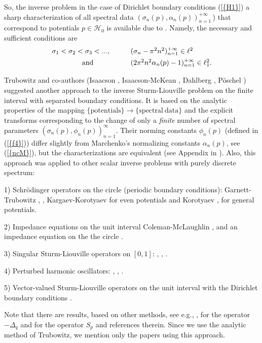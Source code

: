 \documentclass[10pt]{amsart}
\begin{document}
So, the inverse problem in the case of Dirichlet boundary conditions
{\textrm{(\ref{{H1}})}} a sharp characterization of  all spectral data
$({\sigma}_n(p),{\alpha}_n(p))_{n=1}^{+{\infty}}$\,) that correspond to potentials
$p\in{{\mathscr H}}_0$ is available due to \cite{MO75}. Namely, the necessary
and sufficient conditions are
\begin{equation}
\label{xMO75}
\begin{array}{cl}
{\sigma}_1<{\sigma}_2<{\sigma}_3<...,\qquad & ({\sigma}_n-\pi^2n^2)_{n=1}^{+{\infty}}\in\ell^2 \cr
\mathrm{and}\vphantom{|^\big|} &
(2\pi^2n^2{\alpha}_n(p)-1)_{n=1}^{+{\infty}}\in\ell_1^2.
\end{array}
\end{equation}

Trubowitz and co-authors (Isaacson \cite{IT83}, Isaacson-McKean
\cite{IMT84},  Dahlberg \cite{DT84}, P\"oschel \cite{PT87})
suggested another approach  to the inverse Sturm-Liouville problem
on the finite interval with separated boundary conditions. It is
based on the analytic properties of the mapping
$\mathrm{\{potentials\}\to\{spectral\ data\}}$ and the explicit
transforms corresponding  to the change of only  a {\it finite}
number of spectral parameters
\mbox{$({\sigma}_n(p),{\phi}_n(p))_{n=1}^{\infty}$}. Their norming constants
${\phi}_n(p)$ (defined in {\textrm{(\ref{{f4}})}}) differ slightly from  Marchenko's
normalizing constants ${\alpha}_n(p)$, see  {\textrm{(\ref{{ncM}})}}, but the
characterizations are equivalent (see Appendix in \cite{CK09}).
Also, this approach was applied to other scalar inverse problems
with purely discrete spectrum:

1) Schr{\"o}dinger operators on the circle (periodic boundary
conditions): Garnett-Trubowitz \cite{GT84}, \cite{GT87},
Kargaev-Korotyaev \cite{KK97} for even potentials and Korotyaev
\cite{K97}, \cite{K99} for general potentials.

2) Impedance equations  on the unit interval Coleman-McLaughlin \cite{CM93},
and an impedance equation  on the  the circle \cite{K00}.

3) Singular Sturm-Liouville operators on $[0,1]$: \cite{GR88}, \cite{Ca97},
\cite{Se07}.

4) Perturbed harmonic oscillators: \cite{MT81}, \cite{CKK04}, \cite{CK07}.

5)  Vector-valued Sturm-Liouville operators
on the unit interval with the Dirichlet boundary conditions \cite{CK09}.

Note that there are results, based on other methods, see e.g.,
\cite{FY02}, \cite{AHM05} for the operator $-{\Delta}_q$ and \cite{Ho05}
for the operator  $S_p$ and references therein. Since we use the
analytic method of Trubowitz, we mention only the papers using this
approach.
\end{document}
